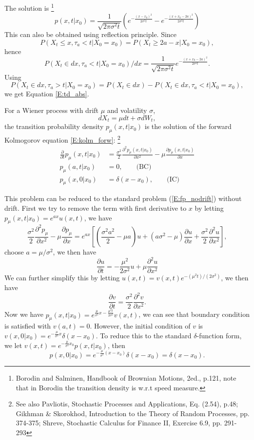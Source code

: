 The solution is
\footnote{Borodin and Salminen, Handbook of Brownian Motions, 2ed., p.121,
note that in Borodin the transition density is w.r.t speed measure.}
\begin{equation} \label{E:td_abs}
  p(x,t|x_0) = \frac{1}{\sqrt{2\pi \sigma^2 t}} 
    \left(  e^{-\frac{(x-x_0)^2}{2\sigma^2 t}} 
          - e^{-\frac{(x+x_0-2a)^2}{2\sigma^2 t}} \right)
\end{equation}
This can also be obtained using reflection principle. Since
\[
  P(X_t\le x, \tau_a<t | X_0=x_0) = P(X_t\ge 2a-x | X_0=x_0),
\]
hence
\[
  P(X_t\in dx, \tau_a<t | X_0=x_0) / dx
    = \frac{1}{\sqrt{2\pi \sigma^2 t}} e^{-\frac{(x+x_0-2a)^2}{2\sigma^2 t}}.
\]
Using
\[
P(X_t\in dx, \tau_a>t | X_0=x_0) 
   = P(X_t\in dx) - P(X_t\in dx, \tau_a<t | X_0=x_0),
\]
we get Equation \ref{E:td_abs}.

For a Wiener process with drift $\mu$ and volatility $\sigma$, 
\[
  dX_t = \mu dt + \sigma dW_t,
\]
the transition probability density $p_{\mu}(x,t|x_0)$ is the solution of the
forward Kolmogorov equation \ref{E:kolm_forw}:
\footnote{See also Pavliotis, Stochastic Processes and Applications, Eq. (2.54), p.48;
  Gikhman \& Skorokhod, Introduction to the Theory of Random Processes, pp. 374-375;
  Shreve, Stochastic Calculus for Finance II, Exercise 6.9, pp. 291-293}
\begin{align*}
  \frac{\partial}{\partial t} p_{\mu}(x,t|x_0)
    &= \frac{\sigma^2}{2} \frac{\partial^2 p_{\mu}(x,t|x_0)}{\partial x^2}   
     - \mu \frac{\partial p_{\mu}(x,t|x_0)}{\partial x}   \\
  p_{\mu}(a,t|x_0) &= 0,  \qquad \text{(BC)}  \\
  p_{\mu}(x,0|x_0) &= \delta (x-x_0),  \qquad \text{(IC)}  
\end{align*}

This problem can be reduced to the standard problem (\ref{E:fp_nodrift}) without
drift. First we try to remove the term with first derivative to $x$ by letting
$p_{\mu}(x,t|x_0)=e^{ax} u(x,t)$, we have
\[
 \frac{\sigma^2}{2} \frac{\partial^2 p_{\mu}}{\partial x^2}
 - \mu \frac{\partial p_{\mu}}{\partial x}
 = e^{ax} \left[
   \left( \frac{\sigma^2 a^2}{2} - \mu a \right) u
   + (a \sigma^2 -\mu) \frac{\partial u}{\partial x}
   + \frac{\sigma^2}{2} \frac{\partial^2 u}{\partial x^2}
  \right],
\]
choose $a=\mu/\sigma^2$, we then have
\[
  \frac{\partial u}{\partial t} 
    = - \frac{\mu^2}{2 \sigma^2} u + \mu \frac{\partial^2 u}{\partial x^2}   
\]
We can further simplify this by letting 
$u(x,t)=v(x,t) e^{-(\mu^2 t)/(2\sigma^2)}$, we then have
\[
  \frac{\partial v}{\partial t} = 
    \frac{\sigma^2}{2} \frac{\partial^2 v}{\partial x^2}.
\]
Now we have
$p_{\mu}(x,t|x_0)=e^{\frac{\mu}{\sigma^2}x-\frac{\mu^2 t}{2\sigma^2}} v(x,t)$,
we can see that boundary condition is satisfied with $v(a,t)=0$. However, the
initial condition of $v$ is 
$v(x,0|x_0)=e^{-\frac{\mu}{\sigma^2} x} \delta(x-x_0)$. To reduce this to the
standard $\delta$-function form, we let 
$v(x,t)=e^{-\frac{\mu}{\sigma^2} x_0} p(x,t|x_0)$, then
\[
  p(x,0|x_0)=e^{-\frac{\mu}{\sigma^2} (x-x_0)} \delta(x-x_0)=\delta(x-x_0).
\]


